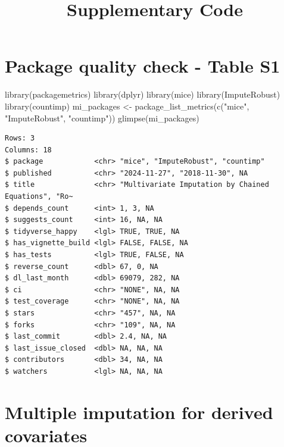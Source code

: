 \documentclass[
]{article}
\title{Supplementary Code}
\author{}
\date{}
\newenvironment{Shaded}{}{}
\newcommand{\FunctionTok}[1]{\textcolor[rgb]{0.44,0.26,0.76}{#1}}
\newcommand{\NormalTok}[1]{\textcolor[rgb]{0.14,0.16,0.18}{#1}}
\newcommand{\OtherTok}[1]{\textcolor[rgb]{0.44,0.26,0.76}{#1}}
\newcommand{\StringTok}[1]{\textcolor[rgb]{0.01,0.18,0.38}{#1}}
\newcommand{\firstsectionspacing}{\titlespacing*{\section}{0pt}{-1cm}{0.5cm}}
\newcommand{\resetsectionspacing}{\titlespacing*{\section}{0pt}{1cm}{0.5cm}}
\begin{document}
\maketitle


\firstsectionspacing

\section{Package quality check - Table
S1}\label{package-quality-check---table-s1}

\begin{Shaded}
\begin{Highlighting}[]
\FunctionTok{library}\NormalTok{(packagemetrics)}
\FunctionTok{library}\NormalTok{(dplyr)}
\FunctionTok{library}\NormalTok{(mice)}
\FunctionTok{library}\NormalTok{(ImputeRobust)}
\FunctionTok{library}\NormalTok{(countimp)}
\NormalTok{mi\_packages }\OtherTok{\textless{}{-}} \FunctionTok{package\_list\_metrics}\NormalTok{(}\FunctionTok{c}\NormalTok{(}\StringTok{"mice"}\NormalTok{, }\StringTok{"ImputeRobust"}\NormalTok{, }\StringTok{"countimp"}\NormalTok{))}
\FunctionTok{glimpse}\NormalTok{(mi\_packages)}
\end{Highlighting}
\end{Shaded}

\begin{verbatim}
Rows: 3
Columns: 18
$ package            <chr> "mice", "ImputeRobust", "countimp"
$ published          <chr> "2024-11-27", "2018-11-30", NA
$ title              <chr> "Multivariate Imputation by Chained Equations", "Ro~
$ depends_count      <int> 1, 3, NA
$ suggests_count     <int> 16, NA, NA
$ tidyverse_happy    <lgl> TRUE, TRUE, NA
$ has_vignette_build <lgl> FALSE, FALSE, NA
$ has_tests          <lgl> TRUE, FALSE, NA
$ reverse_count      <dbl> 67, 0, NA
$ dl_last_month      <dbl> 69079, 282, NA
$ ci                 <chr> "NONE", NA, NA
$ test_coverage      <chr> "NONE", NA, NA
$ stars              <chr> "457", NA, NA
$ forks              <chr> "109", NA, NA
$ last_commit        <dbl> 2.4, NA, NA
$ last_issue_closed  <dbl> NA, NA, NA
$ contributors       <dbl> 34, NA, NA
$ watchers           <lgl> NA, NA, NA
\end{verbatim}

\resetsectionspacing

\section{Multiple imputation for derived
covariates}\label{multiple-imputation-for-derived-covariates}
\end{document}
